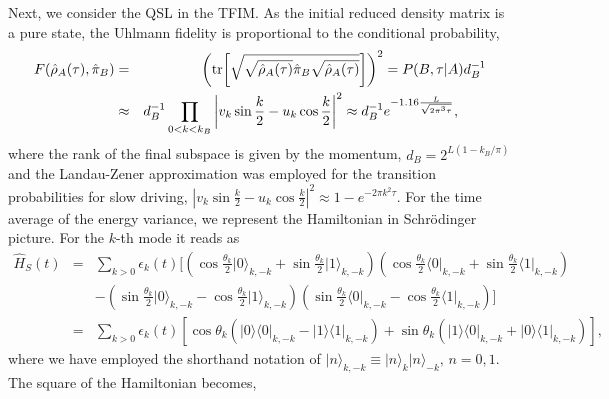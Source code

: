 \documentclass[prl,aps,amssymb,twocolumn,superscriptaddress, notitlepage, longbibliography]{revtex4-2}
\begin{document}
Next, we consider the QSL in the TFIM. As the initial reduced density matrix is a pure state, the Uhlmann fidelity is proportional to the conditional probability,
\begin{eqnarray}
F(\hat\rho_A(\tau),\hat\pi_B)&=&\left(\tr[\sqrt{\sqrt{\hat\rho_A(\tau)}\hat\pi_B\sqrt{\hat\rho_A(\tau)}}]\right)^2=P(B,\tau\vert A)d^{-1}_B\nonumber\\
&\approx&d^{-1}_B\prod_{0<k<k_B}\left\lvert v_k\sin \frac{k}{2}-u_k\cos \frac{k}{2} \right\rvert^2\approx d^{-1}_Be^{-1.16\frac{L}{\sqrt{2\pi^3 \tau}}},\qquad
\end{eqnarray}
where the rank of the final subspace is given by the momentum, $d_B=2^{L(1-k_B/\pi)}$ and the Landau-Zener approximation was employed for the transition probabilities for slow driving, $\left\lvert v_k\sin \frac{k}{2}-u_k\cos \frac{k}{2} \right\rvert^2\approx 1-e^{-2\pi k^2\tau}$.
For the time average of the energy variance, we represent the Hamiltonian in Schr\"odinger picture. For the $k$-th mode it reads as
\begin{eqnarray}
    \hat H_S(t)&=&\sum_{k>0}\epsilon_k(t)\Big[\left(\cos\frac{\theta_k}{2}\lvert 0\rangle_{k,-k}+\sin\frac{\theta_k}{2}\lvert1\rangle_{k,-k}\right)\left(\cos\frac{\theta_k}{2}\langle 0\rvert_{k,-k}+\sin\frac{\theta_k}{2}\langle1\rvert_{k,-k}\right)\\
    &&-\left(\sin\frac{\theta_k}{2}\lvert 0\rangle_{k,-k}-\cos\frac{\theta_k}{2}\lvert1\rangle_{k,-k}\right)\left(\sin\frac{\theta_k}{2}\langle 0\rvert_{k,-k}-\cos\frac{\theta_k}{2}\langle1\rvert_{k,-k}\right)\Big]\nonumber\\
    &=&\sum_{k>0}\epsilon_k(t)\left[\cos\theta_k\left(\lvert 0\rangle\langle 0\rvert_{k,-k}-\lvert 1\rangle\langle 1\rvert_{k,-k}\right)+\sin\theta_k\left(\lvert 1\rangle\langle 0\rvert_{k,-k}+\lvert 0\rangle\langle 1\rvert_{k,-k}\right)\right],\nonumber
\end{eqnarray}
where we have employed the shorthand notation of $\lvert n\rangle_{k,-k}\equiv\lvert n\rangle_k\lvert n\rangle_{-k},\,n=0,1$.
The square of the Hamiltonian becomes,
\end{document}
